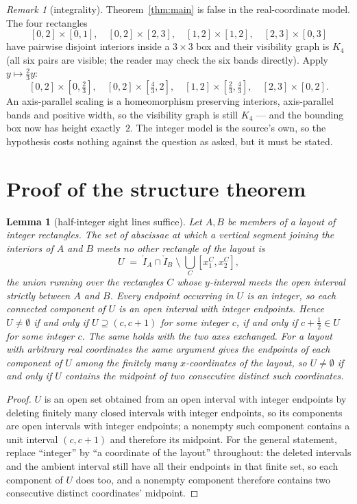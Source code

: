 \documentclass[11pt]{amsart}
\newtheorem{lemma}[theorem]{Lemma}
\theoremstyle{remark}
\newtheorem{remark}[theorem]{Remark}
\begin{document}
\begin{remark}[integrality]\label{rem:integral}
Theorem~\ref{thm:main} is false in the real-coordinate model. The four rectangles
\[
 [0,2]\times[0,1],\quad [0,2]\times[2,3],\quad [1,2]\times[1,2],\quad [2,3]\times[0,3]
\]
have pairwise disjoint interiors inside a $3\times3$ box and their visibility graph is
$K_4$ (all six pairs are visible; the reader may check the six bands directly). Apply
$y\mapsto \tfrac23 y$:
\[
 [0,2]\times[0,\tfrac23],\quad [0,2]\times[\tfrac43,2],\quad
 [1,2]\times[\tfrac23,\tfrac43],\quad [2,3]\times[0,2].
\]
An axis-parallel scaling is a homeomorphism preserving interiors, axis-parallel bands
and positive width, so the visibility graph is still $K_4$ --- and the bounding box now
has height exactly~$2$. The integer model is the source's own, so the hypothesis costs
nothing against the question as asked, but it must be stated.
\end{remark}

\section{Proof of the structure theorem}

\begin{lemma}[half-integer sight lines suffice]\label{lem:half}
Let $A,B$ be members of a layout of integer rectangles. The set of abscissae at which a
vertical segment joining the interiors of $A$ and $B$ meets no other rectangle of the
layout is
\[
 U \;=\; \mathring{I}_A\cap \mathring{I}_B \;\setminus\; \bigcup_C [x_1^C,x_2^C],
\]
the union running over the rectangles $C$ whose $y$-interval meets the open interval
strictly between $A$ and $B$. Every endpoint occurring in $U$ is an integer, so each
connected component of $U$ is an open interval with integer endpoints. Hence $U\neq
\emptyset$ if and only if $U\supseteq(c,c+1)$ for some integer $c$, if and only if
$c+\tfrac12\in U$ for some integer $c$. The same holds with the two axes exchanged.
For a layout with arbitrary real coordinates the same argument gives the endpoints of
each component of $U$ among the finitely many $x$-coordinates of the layout, so
$U\ne\emptyset$ if and only if $U$ contains the midpoint of two consecutive distinct
such coordinates.
\end{lemma}

\begin{proof}
$U$ is an open set obtained from an open interval with integer endpoints by deleting
finitely many closed intervals with integer endpoints, so its components are open
intervals with integer endpoints; a nonempty such component contains a unit interval
$(c,c+1)$ and therefore its midpoint. For the general statement, replace ``integer'' by
``a coordinate of the layout'' throughout: the deleted intervals and the ambient interval
still have all their endpoints in that finite set, so each component of $U$ does too, and
a nonempty component therefore contains two consecutive distinct coordinates' midpoint.
\end{proof}
\end{document}
